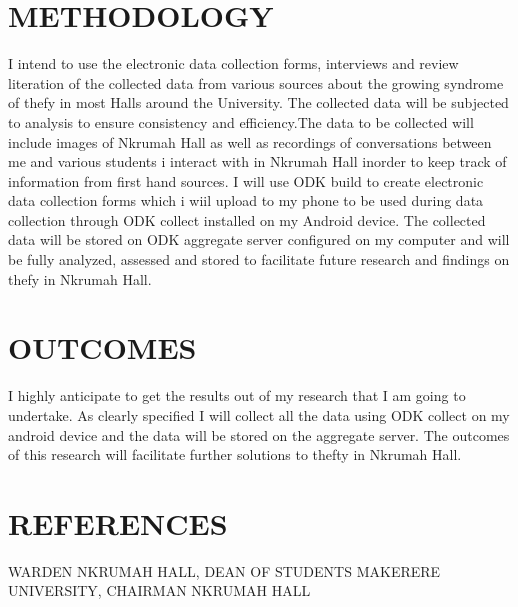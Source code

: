 \documentclass[10pt]{article}
\begin{document}
\section{METHODOLOGY}
{I intend to use the electronic data collection forms, interviews and review literation of the collected data from various sources about the growing syndrome of thefy in most Halls around the University. The collected data will be subjected to analysis to ensure consistency and efficiency.The data to be collected will include images of Nkrumah Hall as well as recordings of conversations between me and various students i interact with in Nkrumah Hall inorder to keep track of information from first hand sources. I will use ODK build to create electronic data collection forms which i wiil upload to my phone to be used during data collection through ODK collect installed on my Android device. The collected data will be stored on ODK aggregate server configured on my computer and will be fully analyzed, assessed and stored to facilitate future research and findings on thefy in Nkrumah Hall.}
\section{OUTCOMES}
{I highly anticipate to get the results out of my research that I am going to
	undertake. As clearly specified I will collect all the data using ODK collect on
	my android device and the data will be stored on the aggregate server. The outcomes
	of this research will facilitate further solutions to thefty in Nkrumah Hall.
}
\section{REFERENCES}
{WARDEN NKRUMAH HALL,  
DEAN OF STUDENTS MAKERERE UNIVERSITY,  
CHAIRMAN NKRUMAH HALL}
\end{document}
